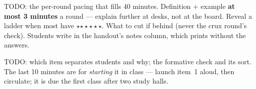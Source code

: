 \documentclass[10pt]{article}
\newcommand{\rung}[1]{{\color{goldacc}\ifcase#1\or$\star$\or$\star\star$\or$\star\star\star$\fi}}
\begin{document}
\begin{teachernote}[Slides]
TODO: the per-round pacing that fills 40 minutes. Definition + example \textbf{at most 3
minutes} a round --- explain further at desks, not at the board. Reveal a ladder when most have
\rung2. What to cut if behind (never the crux round's check). Students write in the handout's
notes column, which prints without the answers.
\end{teachernote}

\begin{teachernote}[Homework]
TODO: which item separates students and why; the formative check and its sort. The last 10
minutes are for \emph{starting} it in class --- launch item~1 aloud, then circulate; it is due the
first class after two study halls.
\end{teachernote}
\end{document}
